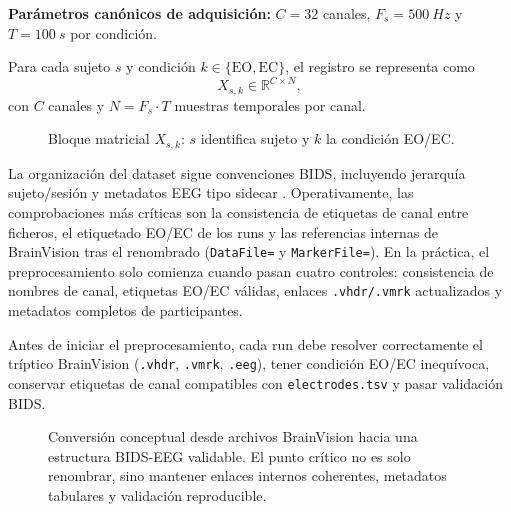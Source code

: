 \begin{parametros}
\textbf{Parámetros canónicos de adquisición:} $C = 32$ canales, $F_s = \SI{500}{Hz}$ y $T = \SI{100}{s}$ por condición.
\end{parametros}
Para cada sujeto $s$ y condición $k \in \{\mathrm{EO},\mathrm{EC}\}$, el registro se representa como
\[
X_{s,k} \in \mathbb{R}^{C \times N},
\]
con $C$ canales y $N = F_s \cdot T$ muestras temporales por canal.
\begin{figure}[H]
\centering
{}
\caption{Bloque matricial $X_{s,k}$: $s$ identifica sujeto y $k$ la condición EO/EC.}
\label{fig:data-matrix-block}
\end{figure}

La organización del dataset sigue convenciones BIDS, incluyendo jerarquía sujeto/sesión y metadatos EEG tipo sidecar \citep{Yamada2018}. Operativamente, las comprobaciones más críticas son la consistencia de etiquetas de canal entre ficheros, el etiquetado EO/EC de los runs y las referencias internas de BrainVision tras el renombrado (\texttt{DataFile=} y \texttt{MarkerFile=}). En la práctica, el preprocesamiento solo comienza cuando pasan cuatro controles: consistencia de nombres de canal, etiquetas EO/EC válidas, enlaces \texttt{.vhdr/.vmrk} actualizados y metadatos completos de participantes.

\begin{controlqc}
Antes de iniciar el preprocesamiento, cada run debe resolver correctamente el tríptico BrainVision (\texttt{.vhdr}, \texttt{.vmrk}, \texttt{.eeg}), tener condición EO/EC inequívoca, conservar etiquetas de canal compatibles con \texttt{electrodes.tsv} y pasar validación BIDS.
\end{controlqc}

\begin{fullwidth}
\begin{figure}[H]
\centering
\resizebox{0.93\fulltextwidth}{!}{\NSBIDSBrainVision}
\caption{Conversión conceptual desde archivos BrainVision hacia una estructura BIDS-EEG validable. El punto crítico no es solo renombrar, sino mantener enlaces internos coherentes, metadatos tabulares y validación reproducible.}
\label{fig:generated-bids-brainvision-flow}
\end{figure}
\end{fullwidth}

